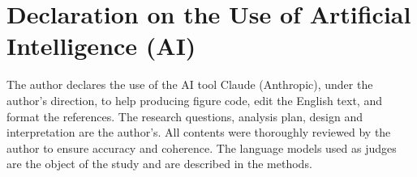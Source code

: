 \documentclass[12pt,letterpaper]{article}
\begin{document}
\section*{Declaration on the Use of Artificial Intelligence (AI)}
The author declares the use of the AI tool Claude (Anthropic), under the author's
direction, to help producing figure code, edit the English text, and format the references.
The research questions, analysis plan, design and interpretation are the author's. All contents were thoroughly reviewed by the
author to ensure accuracy and coherence. The language models used as judges are the object
of the study and are described in the methods.
\end{document}
